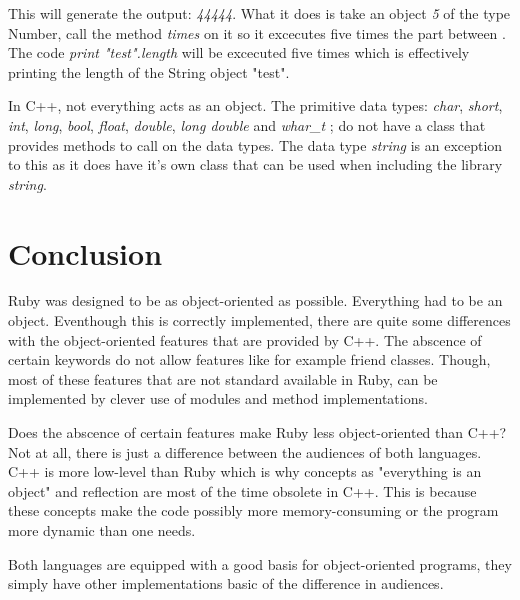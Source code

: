 \documentclass[10pt,a4paper,twocolumn]{article}
\begin{document}
This will generate the output: \textit{44444}. What it does is take an object \textit{5} of the type Number, call the method \textit{times} on it so it excecutes five times the part between . The code \textit{print "test".length} will be excecuted five times which is effectively printing the length of the String object "test".

In C++, not everything acts as an object. The primitive data types: \textit{char}, \textit{short}, \textit{int}, \textit{long}, \textit{bool}, \textit{float}, \textit{double}, \textit{long double} and \textit{whar\_t} ; do not have a class that provides methods to call on the data types. The data type \textit{string} is an exception to this as it does have it's own class that can be used when including the library \textit{string}.

\section{Conclusion}
Ruby was designed to be as object-oriented as possible. Everything had to be an object. Eventhough this is correctly implemented, there are quite some differences with the object-oriented features that are provided by C++. The abscence of certain keywords do not allow features like for example friend classes. Though, most of these features that are not standard available in Ruby, can be implemented by clever use of modules and method implementations.

Does the abscence of certain features make Ruby less object-oriented than C++? Not at all, there is just a difference between the audiences of both languages. C++ is more low-level than Ruby which is why concepts as "everything is an object" and reflection are most of the time obsolete in C++. This is because these concepts make the code possibly more memory-consuming or the program more dynamic than one needs.

Both languages are equipped with a good basis for object-oriented programs, they simply have other implementations basic of the difference in audiences.
\end{document}
